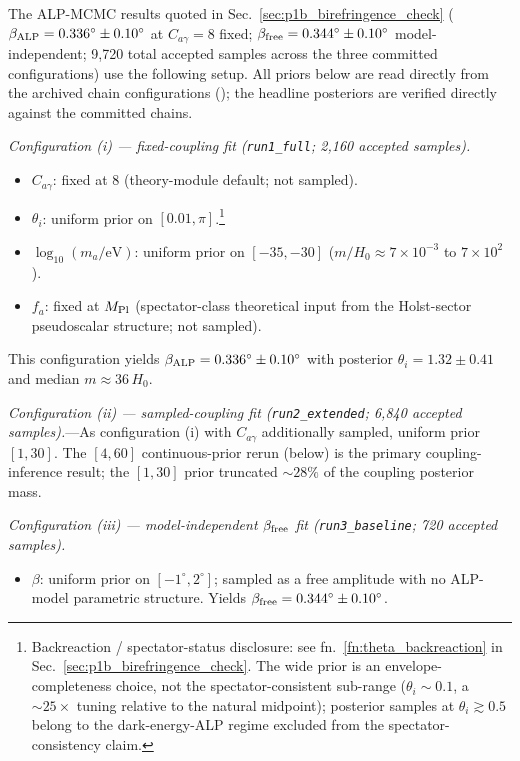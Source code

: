 \documentclass[aps,prd,twocolumn,superscriptaddress,showpacs,preprintnumbers,nofootinbib,longbibliography,floatfix]{revtex4-2}
\newcommand{\MPl}{M_{\rm Pl}}
\begin{document}
The ALP-MCMC results quoted in Sec.~\ref{sec:p1b_birefringence_check}
($\beta_{\rm ALP} = 0.336^\circ\pm 0.10^\circ$ at $C_{a\gamma}=8$ fixed;
$\beta_{\rm free} = 0.344^\circ\pm 0.10^\circ$ model-independent;
9{,}720 total accepted samples across the three committed configurations)
use the following setup. All priors below are read directly from the
archived chain configurations
();
the headline posteriors are verified directly against the committed chains.

\textit{Configuration (i) --- fixed-coupling fit (\texttt{run1\_full};
2{,}160 accepted samples).}
\begin{itemize}[leftmargin=*]
\item $C_{a\gamma}$: fixed at $8$ (theory-module default; not sampled).
\item $\theta_i$: uniform prior on $[0.01, \pi]$.\footnote{Backreaction /
spectator-status disclosure: see fn.~\ref{fn:theta_backreaction} in
Sec.~\ref{sec:p1b_birefringence_check}. The wide prior is an
envelope-completeness choice, not the spectator-consistent sub-range
($\theta_i\sim 0.1$, a $\sim 25\times$ tuning relative to the natural
midpoint); posterior samples at $\theta_i\gtrsim 0.5$ belong to the
dark-energy-ALP regime excluded from the spectator-consistency claim.}
\item $\log_{10}(m_a/\text{eV})$: uniform prior on $[-35, -30]$
($m/H_0 \approx 7\times 10^{-3}$ to $7\times 10^{2}$).
\item $f_a$: fixed at $\MPl$ (spectator-class theoretical input from the
Holst-sector pseudoscalar structure; not sampled).
\end{itemize}
This configuration yields $\beta_{\rm ALP} = 0.336^\circ\pm 0.10^\circ$
with posterior $\theta_i = 1.32\pm 0.41$ and median $m\approx 36\,H_0$.

\textit{Configuration (ii) --- sampled-coupling fit
(\texttt{run2\_extended}; 6{,}840 accepted samples).}---As configuration
(i) with $C_{a\gamma}$ additionally sampled, uniform prior $[1,30]$.
The $[4,60]$ continuous-prior rerun (below) is the primary coupling-inference
result; the $[1,30]$ prior truncated ${\sim}28\%$ of the coupling
posterior mass.

\textit{Configuration (iii) --- model-independent $\beta_{\rm free}$ fit
(\texttt{run3\_baseline}; 720 accepted samples).}
\begin{itemize}[leftmargin=*]
\item $\beta$: uniform prior on $[-1^\circ, 2^\circ]$; sampled as a free
amplitude with no ALP-model parametric structure. Yields
$\beta_{\rm free} = 0.344^\circ \pm 0.10^\circ$.
\end{itemize}
\end{document}
